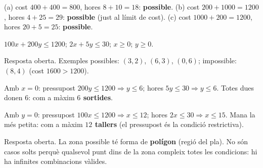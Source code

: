 \begin{solucions}
\begin{sollist}
  \item (a) cost $400+400=800$, hores $8+10=18$: \textbf{possible}. \quad
        (b) cost $200+\num{1000}=\num{1200}$, hores $4+25=29$: \textbf{possible}
        (just al límit de cost). \quad
        (c) cost $\num{1000}+200=\num{1200}$, hores $20+5=25$: \textbf{possible}.
  \item $100x+200y\le\num{1200}$; \;$2x+5y\le 30$; \;$x\ge 0$; \;$y\ge 0$.
  \item Resposta oberta. Exemples possibles: $(3,2)$, $(6,3)$, $(0,6)$; impossible:
        $(8,4)$ (cost $\num{1600}>\num{1200}$).
  \item Amb $x=0$: pressupost $200y\le\num{1200}\Rightarrow y\le 6$; hores
        $5y\le 30\Rightarrow y\le 6$. Totes dues donen $6$: com a màxim \textbf{$6$
        sortides}.
  \item Amb $y=0$: pressupost $100x\le\num{1200}\Rightarrow x\le 12$; hores
        $2x\le 30\Rightarrow x\le 15$. Mana la més petita: com a màxim \textbf{$12$
        tallers} (el pressupost és la condició restrictiva).
  \item Resposta oberta. La zona possible té forma de \textbf{polígon} (regió del
        pla). No són casos solts perquè qualsevol punt dins de la zona compleix totes
        les condicions: hi ha infinites combinacions vàlides.
\end{sollist}
\end{solucions}
